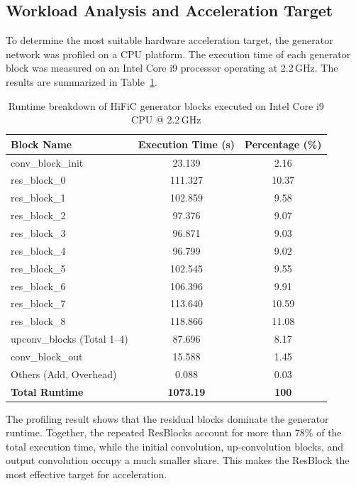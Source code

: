 \subsection{Workload Analysis and Acceleration Target}

To determine the most suitable hardware acceleration target, the generator network was profiled on a CPU platform. The execution time of each generator block was measured on an Intel Core i9 processor operating at 2.2\,GHz. The results are summarized in Table~\ref{tab:runtime_breakdown}.

\begin{table}[H]
\centering
\caption{Runtime breakdown of HiFiC generator blocks executed on Intel Core i9 CPU @ 2.2\,GHz}
\label{tab:runtime_breakdown}
\begin{tabular}{|l|c|c|}
\hline
\textbf{Block Name} & \textbf{Execution Time (s)} & \textbf{Percentage (\%)} \\ \hline
conv\_block\_init & 23.139 & 2.16 \\ \hline
res\_block\_0 & 111.327 & 10.37 \\ \hline
res\_block\_1 & 102.859 & 9.58 \\ \hline
res\_block\_2 & 97.376 & 9.07 \\ \hline
res\_block\_3 & 96.871 & 9.03 \\ \hline
res\_block\_4 & 96.799 & 9.02 \\ \hline
res\_block\_5 & 102.545 & 9.55 \\ \hline
res\_block\_6 & 106.396 & 9.91 \\ \hline
res\_block\_7 & 113.640 & 10.59 \\ \hline
res\_block\_8 & 118.866 & 11.08 \\ \hline
upconv\_blocks (Total 1--4) & 87.696 & 8.17 \\ \hline
conv\_block\_out & 15.588 & 1.45 \\ \hline
Others (Add, Overhead) & 0.088 & 0.03 \\ \hline
\textbf{Total Runtime} & \textbf{1073.19} & \textbf{100} \\ \hline
\end{tabular}
\end{table}

The profiling result shows that the residual blocks dominate the generator runtime. Together, the repeated ResBlocks account for more than 78\% of the total execution time, while the initial convolution, up-convolution blocks, and output convolution occupy a much smaller share. This makes the ResBlock the most effective target for acceleration.

